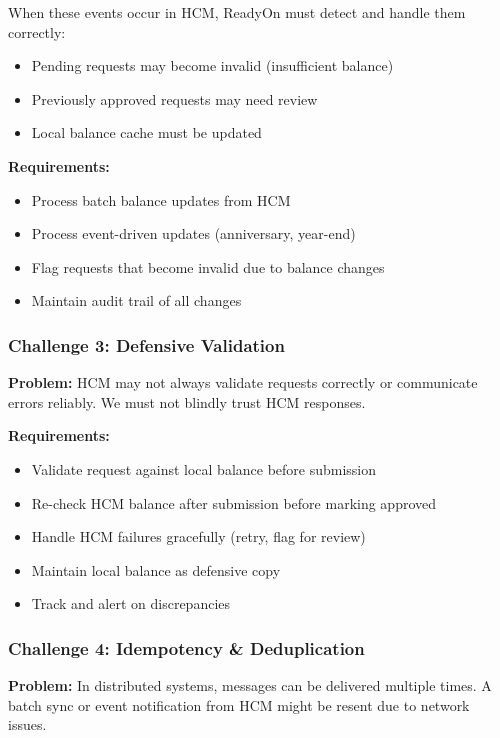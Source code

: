 \documentclass[12pt,a4paper]{article}
\begin{document}
When these events occur in HCM, ReadyOn must detect and handle them correctly:
\begin{itemize}
    \item Pending requests may become invalid (insufficient balance)
    \item Previously approved requests may need review
    \item Local balance cache must be updated
\end{itemize}

\textbf{Requirements:}
\begin{itemize}
    \item Process batch balance updates from HCM
    \item Process event-driven updates (anniversary, year-end)
    \item Flag requests that become invalid due to balance changes
    \item Maintain audit trail of all changes
\end{itemize}

\subsubsection{Challenge 3: Defensive Validation}

\textbf{Problem:} HCM may not always validate requests correctly or communicate errors reliably. We must not blindly trust HCM responses.

\textbf{Requirements:}
\begin{itemize}
    \item Validate request against local balance before submission
    \item Re-check HCM balance after submission before marking approved
    \item Handle HCM failures gracefully (retry, flag for review)
    \item Maintain local balance as defensive copy
    \item Track and alert on discrepancies
\end{itemize}

\subsubsection{Challenge 4: Idempotency \& Deduplication}

\textbf{Problem:} In distributed systems, messages can be delivered multiple times. A batch sync or event notification from HCM might be resent due to network issues.
\end{document}
